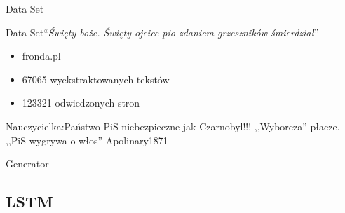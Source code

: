 \documentclass[14pt]{beamer}
\newcommand{\fakehead}[1]{``\textit{#1}''}
\begin{document}
\begin{section}{Data Set}
	\begin{frame}{Data Set}{\fakehead{Święty boże. Święty ojciec pio zdaniem grzeszników śmierdział}}
		\begin{itemize}
			\item fronda.pl
			\item{67065 wyekstraktowanych tekstów}
			\item{123321 odwiedzonych stron}
		\end{itemize}

		Nauczycielka:Państwo PiS niebezpieczne jak Czarnobyl!!!
		,,Wyborcza'' płacze. ,,PiS wygrywa o włos''
		Apolinary1871
	\end{frame}
\end{section}

\begin{section}{Generator}
	\subsection{LSTM}


\end{section}
\end{document}
